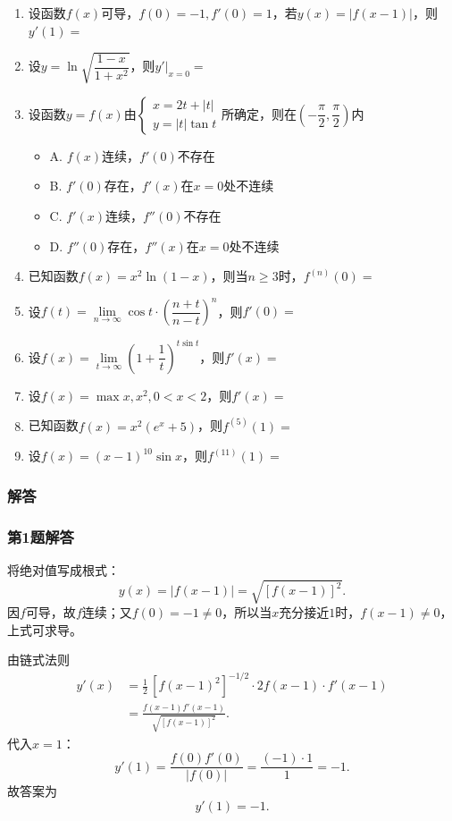 \documentclass[./book.tex]{subfiles}
\begin{document}
    \begin{enumerate}
        \item 设函数$f(x)$可导，$f(0) = -1, f'(0) = 1$，若$y(x) = |f(x-1)|$，则$y'(1) = $
        \item 设$y = \ln \sqrt{\dfrac{1-x}{1+x^2}}$，则$y'\big|_{x=0} = $
        \item 设函数$y = f(x)$由$\begin{cases}
                                     x = 2t + |t| \\
                                     y = |t|\tan t
        \end{cases}$所确定，则在$(-\dfrac{\pi}{2}, \dfrac{\pi}{2})$内
        \begin{itemize}
            \item A. $f(x)$连续，$f'(0)$不存在
            \item B. $f'(0)$存在，$f'(x)$在$x = 0$处不连续
            \item C. $f'(x)$连续，$f''(0)$不存在
            \item D. $f''(0)$存在，$f''(x)$在$x = 0$处不连续
        \end{itemize}
        \item 已知函数$f(x) = x^2\ln(1-x)$，则当$n \geq 3$时，$f^{(n)}(0) = $
        \item 设$f(t) = \lim\limits_{n\to \infty} \cos t\cdot (\dfrac{n + t}{n - t})^n$，则$f'(0) = $
        \item 设$f(x) = \lim\limits_{t\to \infty} (1 + \dfrac{1}{t})^{t\sin t}$，则$f'(x) = $
        \item 设$f(x) = \max {x, x^2}, 0 < x < 2$，则$f'(x) = $
        \item 已知函数$f(x) = x^2(e^x + 5)$，则$f^{(5)}(1) = $
        \item 设$f(x) = (x-1)^{10}\sin x$，则$f^{(11)}(1) = $
    \end{enumerate}

    \subsubsection{解答}

    \subsubsection*{第1题解答}
    \begin{analysisbox}
        将绝对值写成根式：
        \[
            y(x)=|f(x-1)|=\sqrt{[f(x-1)]^2}.
        \]
        因$f$可导，故$f$连续；又$f(0)=-1\neq 0$，所以当$x$充分接近$1$时，$f(x-1)\neq 0$，上式可求导。

        由链式法则
        \[
            \begin{aligned}
                y'(x)
                &=\frac{1}{2}\,[f(x-1)^2]^{-1/2}\cdot 2f(x-1)\cdot f'(x-1)\\
                &=\frac{f(x-1)f'(x-1)}{\sqrt{[f(x-1)]^2}}.
            \end{aligned}
        \]
        代入$x=1$：
        \[
            y'(1)=\frac{f(0)f'(0)}{|f(0)|}
            =\frac{(-1)\cdot 1}{1}
            =-1.
        \]
        故答案为
        \[
            \boxed{y'(1)=-1}.
        \]
    \end{analysisbox}
\end{document}
